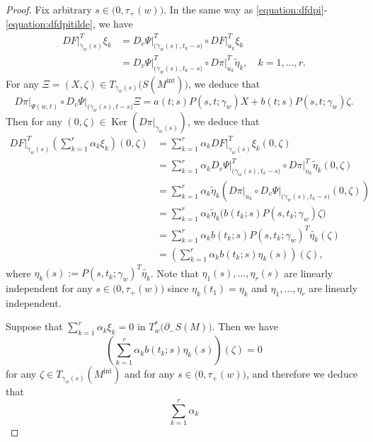 \documentclass[a4paper,11pt,reqno]{amsart}
\numberwithin{equation}{section}
\theoremstyle{definition}
\theoremstyle{remark}
\begin{document}
\begin{proof}
Fix arbitrary $s \in \bigl(0,\tau_+(w)\bigr)$. 
In the same way as \eqref{equation:dfdpi}-\eqref{equation:dfdpitilde}, we have 
%
%
\begin{align*}
  DF\vert^T_{\dot{\gamma}_w(s)}\xi_k
& =
  D_v\Psi\vert^T_{\bigl(\dot{\gamma}_w(s),t_k-s\bigr)}
  \circ
  DF\vert^T_{u_k}\xi_k
\\
& =
  D_v\Psi\vert^T_{\bigl(\dot{\gamma}_w(s),t_k-s\bigr)}
  \circ
  D\pi\vert^T_{u_k}\tilde{\eta}_k,
  \quad
  k=1,\dotsc,r. 
\end{align*}
%
%
For any $\Xi=(X,\zeta) \in T_{\dot{\gamma}_w(s)}\bigl(S(M^\text{int})\bigr)$, we deduce that 
%
%
$$
D\pi\vert_{\Psi(w,t)}
\circ
D_v\Psi\vert_{\bigl(\dot{\gamma}_w(s),t-s\bigr)}\Xi
=
a(t;s)P(s,t;\gamma_w)X+b(t;s)P(s,t;\gamma_w)\zeta. 
$$
%
%
Then for any $(0,\zeta) \in \operatorname{Ker}(D\pi\vert_{\dot{\gamma}_w(s)})$, we deduce that 
%
%
\begin{align*}
  DF\vert^T_{\dot{\gamma}_w(s)}\left(\sum_{k=1}^r\alpha_k\xi_k\right)(0,\zeta)
& =
  \sum_{k=1}^r
  \alpha_k
  DF\vert^T_{\dot{\gamma}_w(s)}\xi_k(0,\zeta)
\\
& =
  \sum_{k=1}^r
  \alpha_k 
  D_v\Psi\vert^T_{\bigl(\dot{\gamma}_w(s),t_k-s\bigr)}
  \circ
  D\pi\vert^T_{u_k}\tilde{\eta}_k(0,\zeta)
\\
& =
  \sum_{k=1}^r
  \alpha_k
  \tilde{\eta}_k
  \left(
  D\pi\vert_{u_k}
  \circ
  D_v\Psi\vert_{\bigl(\dot{\gamma}_w(s),t_k-s\bigr)}
  (0,\zeta)
  \right) 
\\
& =
  \sum_{k=1}^r
  \alpha_k
  \tilde{\eta}_k
  \bigl(
  b(t_k;s)P(s,t_k;\gamma_w)\zeta
  \bigr)
\\
& =
  \sum_{k=1}^r
  \alpha_k
  b(t_k;s)
  P(s,t_k;\gamma_w)^T\tilde{\eta_k}(\zeta)
\\
& =
  \left(
  \sum_{k=1}^r
  \alpha_k
  b(t_k;s)
  \eta_k(s)
  \right)(\zeta), 
\end{align*}
%
%
where $\eta_k(s):=P(s,t_k;\gamma_w)^T\tilde{\eta_k}$. 
Note that $\eta_1(s),\dotsc,\eta_r(s)$ are linearly independent 
for any $s\in\bigl(0,\tau_+(w)\bigr)$ since 
$\eta_k(t_1)=\eta_k$ and $\eta_1,\dotsc,\eta_r$ are linearly independent.    
%
%
\par
%
%
Suppose that $\sum_{k=1}^r\alpha_k\xi_k=0$ in $T^\ast_w\bigl(\partial_-S(M)\bigr)$. 
Then we have 
%
%
$$
\left(
\sum_{k=1}^r
\alpha_k
b(t_k;s)
\eta_k(s)
\right)(\zeta)
=
0
$$
%
%
for any $\zeta \in T_{\gamma_w(s)}(M^\text{int})$ and for any $s\in\bigl(0,\tau_+(w)\bigr)$, 
and therefore we deduce that 
%
%
$$
\sum_{k=1}^r
\alpha_k
$$
\end{proof}
\end{document}
